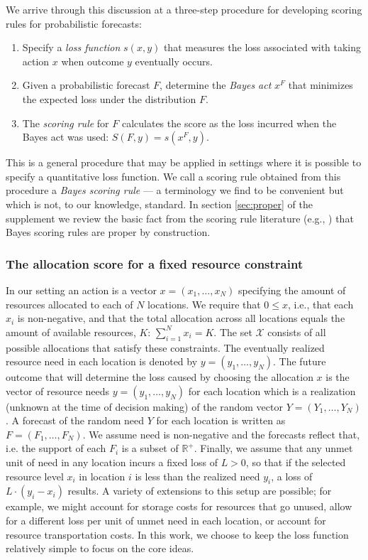 \documentclass{article}\usepackage[]{graphicx}\usepackage[]{xcolor}
\begin{document}
We arrive through this discussion at a three-step procedure for developing scoring rules for probabilistic forecasts:
\begin{enumerate}
  \item Specify a \emph{loss function} $s(x, y)$ that measures the loss associated with taking action $x$ when outcome $y$
    eventually occurs.
  \item Given a probabilistic forecast $F$, determine the \emph{Bayes act} $x^F$ that minimizes the expected loss under
    the distribution $F$.
  \item The \emph{scoring rule} for $F$ calculates the score as the loss incurred when the Bayes act was used: 
    $S(F, y) = s(x^F, y)$.
\end{enumerate}
This is a general procedure that may be applied in settings where it is possible to specify a quantitative loss
function. We call a scoring rule obtained from this procedure a \emph{Bayes scoring rule} --- a terminology we find to
be convenient but which is not, to our knowledge, standard.  In section \ref{sec:proper} of the supplement we review the
basic fact from the scoring rule literature (e.g., \cite{dawid2007geometry,gneiting2007strictly}) that Bayes scoring
rules are proper by construction.

\subsubsection{The allocation score for a fixed resource constraint}
\label{sec:methods.detailed.specific_allocation}

In our setting an action is a vector $x = (x_1, \ldots, x_N)$ specifying the amount of resources allocated to each of
$N$ locations. We require that $0 \leq x$, i.e., that each $x_i$ is non-negative, and that the total allocation across
all locations equals the amount of available resources, $K$: $\sum_{i=1}^N x_i = K$. The set $\mathcal{X}$ consists of
all possible allocations that satisfy these constraints. The eventually realized resource need in each location is
denoted by $y = (y_1, \ldots, y_N)$. The future outcome that will determine the loss caused by choosing the allocation
$x$ is the vector of resource needs $y = (y_1, \ldots, y_N)$ for each location which is a realization (unknown at the
time of decision making) of the random vector $Y = (Y_1, \ldots, Y_N)$. A forecast of the random need $Y$ for each
location is written as $F = (F_1, \ldots, F_N)$. We assume need is non-negative and the forecasts reflect that, i.e. the
support of each $F_i$ is a subset of $\mathbb{R}^+$. Finally, we assume that any unmet unit of need in any location
incurs a fixed loss of $L>0$, so that if the selected resource level $x_i$ in location $i$ is less than the realized
need $y_i$, a loss of $L \cdot (y_i - x_i)$ results. A variety of extensions to this setup are possible; for example, we
might account for storage costs for resources that go unused, allow for a different loss per unit of unmet need in each
location, or account for resource transportation costs. In this work, we choose to keep the loss function relatively
simple to focus on the core ideas.
\end{document}
